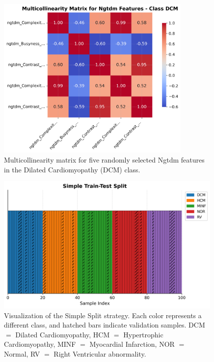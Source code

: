 \begin{figure}
	\begin{center}
		\includegraphics[width=0.85\textwidth]{../images/eda/multicollinearity.png}
	\end{center}
	\caption{Multicollinearity matrix for five randomly selected Ngtdm features
		in the Dilated Cardiomyopathy (DCM) class.}
	\label{fig:figA5}
\end{figure}

\begin{figure}
	\begin{center}
		\includegraphics[width=0.99\textwidth]{../images/splits/simple.png}
	\end{center}
	\caption{Visualization of the Simple Split strategy. Each color represents a
		different class, and hatched bars indicate validation samples. DCM $=$
		Dilated Cardiomyopathy, HCM $=$ Hypertrophic Cardiomyopathy, MINF $=$
		Myocardial Infarction, NOR $=$ Normal, RV $=$ Right Ventricular abnormality.}
	\label{fig:figA6}
\end{figure}

